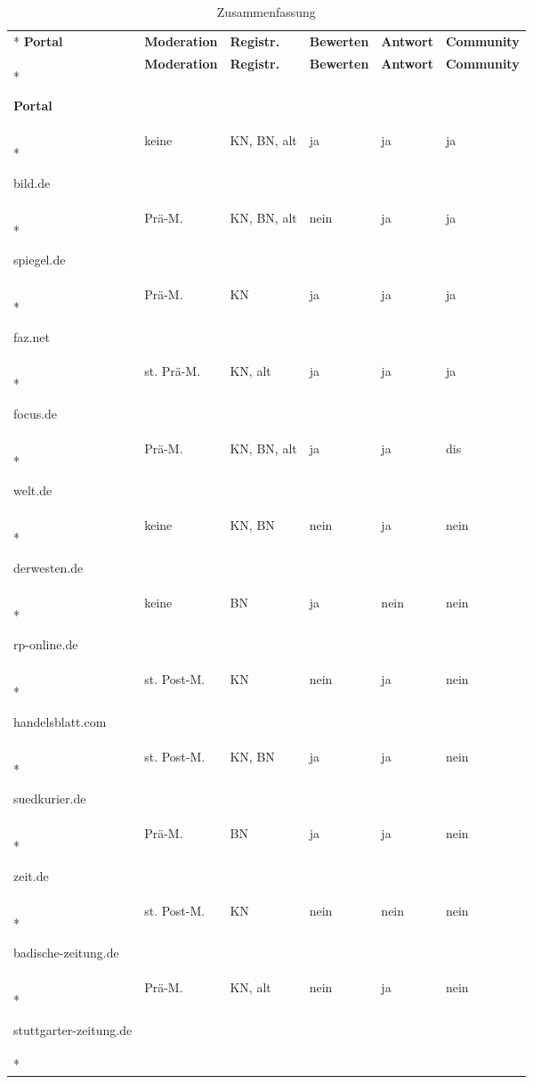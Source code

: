 \begingroup
  \footnotesize
  \begin{longtable}{p{28mm}*{5}{l}}

    \caption{Zusammenfassung} \\*
    \toprule
    \bfseries Portal & \bfseries Moderation & \bfseries Registr. & \bfseries Bewerten & \bfseries Antwort
    & \bfseries Community\\*\toprule
    \endfirsthead

    \toprule
    \bfseries Portal & \bfseries Moderation & \bfseries Registr. & \bfseries Bewerten & \bfseries Antwort
    & \bfseries Community\\*\toprule
    \endhead

    \multicolumn{6}{r}{\emph{Fortsetzung auf der nächsten Seite}}
    \endfoot

    \bottomrule
    \endlastfoot

bild.de
& keine
& KN, BN, alt
& ja
& ja
& ja
\\*\midrule

spiegel.de
& Prä-M.
& KN, BN, alt
& nein
& ja
& ja
\\*\midrule

faz.net
& Prä-M.
& KN
& ja
& ja
& ja
\\*\midrule

focus.de
& st. Prä-M.
& KN, alt
& ja
& ja
& ja
\\*\midrule

welt.de
& Prä-M.
& KN, BN, alt
& ja
& ja
& dis
\\*\midrule

derwesten.de
& keine
& KN, BN
& nein
& ja
& nein
\\*\midrule

rp-online.de
& keine
& BN
& ja
& nein
& nein
\\*\midrule

handelsblatt.com
& st. Post-M.
& KN
& nein
& ja
& nein
\\*\midrule

suedkurier.de
& st. Post-M.
& KN, BN
& ja
& ja
& nein
\\*\midrule

zeit.de
& Prä-M.
& BN
& ja
& ja
& nein
\\*\midrule

badische-zeitung.de
& st. Post-M.
& KN
&nein
&nein
& nein
\\*\midrule

stuttgarter-zeitung.de
& Prä-M.
& KN, alt
& nein
& ja
& nein
\\*\midrule


\end{longtable}
